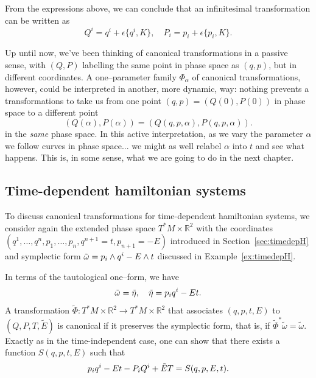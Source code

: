 \documentclass[english,fontsize=11pt,paper=a5,oneside]{scrbook}
\newcommand{\R}{\mathbb{R}}
\let\d\relax
\DeclareMathOperator{\d}{d}
\theoremstyle{definition}
\begin{document}
From the expressions above, we can conclude that an infinitesimal transformation can be written as
\begin{equation}\label{eq:forminfct}
    Q^i = q^i + \epsilon \big\{q^i, K\big\}, \quad
    P_i = p_i + \epsilon \big\{p_i, K\big\}.
\end{equation}

Up until now, we've been thinking of canonical transformations in a passive sense, with $(Q,P)$ labelling the same point in phase space as $(q, p)$, but in different coordinates.
A one--parameter family $\Phi_\alpha$ of canonical transformations, however, could be interpreted in another, more dynamic, way: nothing prevents a transformations to take us from one point $(q,p)=(Q(0), P(0))$ in phase space to a different point
\begin{equation}
    (Q(\alpha),P(\alpha)) = (Q(q,p,\alpha), P(q,p,\alpha)).    
\end{equation}
in the \emph{same} phase space.
In this active interpretation, as we vary the parameter $\alpha$ we follow curves in phase space... we might as well relabel $\alpha$ into $t$ and see what happens.
This is, in some sense, what we are going to do in the next chapter.

\subsection{Time-dependent hamiltonian systems}

To discuss canonical transformations for time-dependent hamiltonian systems, we consider again the extended phase space $T^*M\times \R^2$ with the coordinates $(q^1,\ldots,q^n,p_1,\ldots,p_n, q^{n+1}=t, p_{n+1}=-E)$ introduced in Section~\ref{sec:timedepH} and symplectic form  $\tilde\omega = \d p_i\wedge \d q^i - \d E\wedge \d t$ discussed in Example~\ref{ex:timedepH}.

In terms of the tautological one--form, we have
\begin{equation}
    \tilde\omega = \d \tilde\eta, \quad \tilde\eta = p_i \d q^i - E \d t.
\end{equation}
A transformation $\tilde\Phi : T^*M\times \R^2 \to T^*M\times \R^2$ that associates $(q,p,t,E)$ to $(Q,P,T,\tilde E)$ is canonical if it preserves the symplectic form, that is, if ${\tilde\Phi}^* \tilde \omega = \tilde \omega$. Exactly as in the time-independent case, one can show that there exists a function $S(q,p,t,E)$ such that
\begin{equation}\label{eq:timedepgen}
    p_i \d q^i -E \d t - P_i \d Q^i + \tilde E \d T = \d S(q,p,E,t).
\end{equation}
\end{document}
